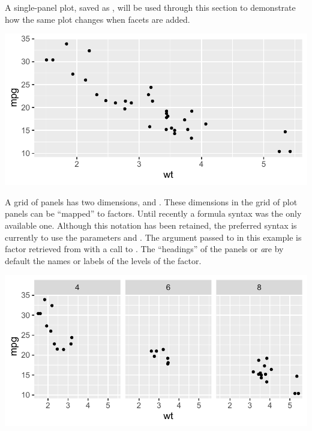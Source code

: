 \documentclass[krantz2]{krantz}\usepackage{knitr}
\begin{document}
A single-panel plot, saved as , will be used through this section to demonstrate how the same plot changes when facets are added.

\begin{knitrout}\footnotesize
{}\color{fgcolor}\begin{kframe}
\begin{alltt}
 \hlkwb{<-}
  \hlstd{(} 
          \hlstd{=} \hlstd{(}    \hlopt{+}
  \hlstd{()}
\end{alltt}
\end{kframe}

{\centering \includegraphics[width=.7\textwidth]{figure/pos-facets-00-1} 

}


\end{knitrout}

A grid of panels has two dimensions,  and . These dimensions in the grid of plot panels can be ``mapped'' to factors. Until recently a formula syntax was the only available one. Although this notation has been retained, the preferred syntax is currently to use the parameters  and . The argument passed to  in this example is factor  retrieved from  with a call to . The ``headings'' of the panels or \emph are by default the names or labels of the levels of the factor.

\begin{knitrout}\footnotesize
{}\color{fgcolor}\begin{kframe}
\begin{alltt}
 \hlopt{+} \hlstd{(} \hlstd{=} 
\end{alltt}
\end{kframe}

{\centering \includegraphics[width=.7\textwidth]{figure/pos-facets-01-1} 

}


\end{knitrout}
\end{document}
